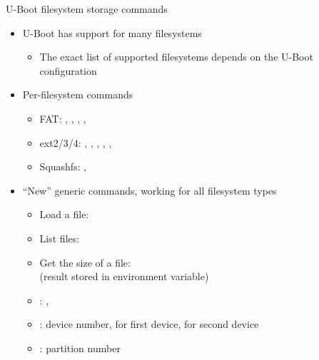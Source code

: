 \begin{frame}{U-Boot filesystem storage commands}
  \begin{itemize}
  \item U-Boot has support for many filesystems
    \begin{itemize}
    \item The exact list of supported filesystems depends on the U-Boot
      configuration
    \end{itemize}
  \item Per-filesystem commands
    \begin{itemize}
    \item FAT: , , ,
      , 
    \item ext2/3/4: , , ,
      , , 
    \item Squashfs: , 
    \end{itemize}
  \item ``New'' generic commands, working for all filesystem types
    \begin{itemize}
    \item Load a file: 
    \item List files: 
    \item Get the size of a file: \\
	  (result stored in  environment variable)
    \item {}: , 
    \item {}: device number,  for first device,  for second device
    \item {}: partition number
    \end{itemize}
  \end{itemize}
\end{frame}

